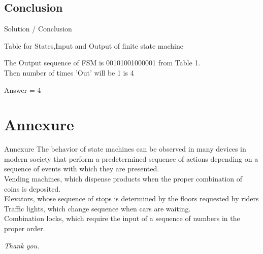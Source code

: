 \documentclass{beamer}
\begin{document}
\subsection{Conclusion}
\begin{frame}{Solution / Conclusion}
\begin{figure}[h]
\centering
\scalebox{0.6}{
}
\caption{}
\label{figure 1}
\end{figure}


    \begin{table}[h]
    \centering
    \scalebox{0.8}{
    }
    \caption{Table for States,Input and Output of finite state machine}
    \label{table}
\end{table}

The Output sequence of FSM is 00101001000001 from Table 1. \\
Then number of times 'Out' will be 1 is 4

\centering 
Answer = 4

\end{frame}

\section{Annexure}

\begin{frame}{Annexure}
    The behavior of state machines can be observed in many devices in modern society that perform a predetermined sequence of actions depending on a sequence of events with which they are presented. \\
    Vending machines, which dispense products when the proper combination of coins is deposited.\\
    Elevators, whose sequence of stops is determined by the floors requested by riders \\
    Traffic lights, which change sequence when cars are waiting. \\
    Combination locks, which require the input of a sequence of numbers in the proper order.
    
\end{frame}

\begin{frame}
    \centering
    \textit{Thank you.}
\end{frame}
\end{document}
